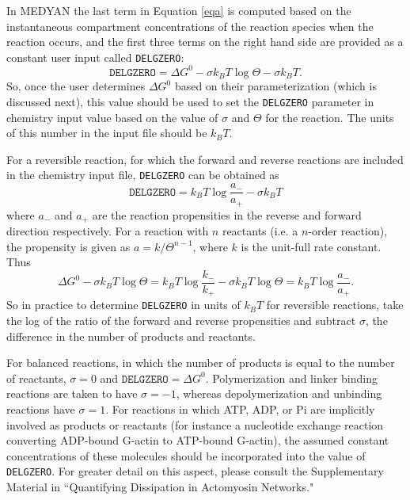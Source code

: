 \documentclass[11pt, oneside]{article}   	%
\begin{document}
In MEDYAN the last term in Equation \ref{eqa} is computed based on the instantaneous compartment concentrations of the reaction species when the reaction occurs, and the first three terms on the right hand side are provided as a constant user input called \texttt{DELGZERO}:
\begin{equation}
\label{eqc}
\texttt{DELGZERO} = \Delta G^0 - \sigma k_B T  \log{\Theta} - \sigma k_B T.
\end{equation}
So, once the user determines $\Delta G^0$ based on their parameterization (which is discussed next), this value should be used to set the \texttt{DELGZERO} parameter in chemistry input value based on the value of $\sigma$ and $\Theta$ for the reaction.  The units of this number in the input file should be $k_B T$.  

For a reversible reaction, for which the forward and reverse reactions are included in the chemistry input file, \texttt{DELGZERO} can be obtained as 
\begin{equation}
\texttt{DELGZERO} = k_B T \log{\frac{a_-}{a_+}} - \sigma k_B T
\end{equation}
where $a_-$ and $a_+$ are the reaction propensities in the reverse and forward direction respectively.  For a reaction with $n$ reactants (i.e. a $n$-order reaction), the propensity is given as $a = k/\Theta^{n-1}$, where $k$ is the unit-full rate constant.  Thus
\begin{equation}
\Delta G^0 - \sigma k_B T \log{\Theta} = k_B T \log{\frac{k_-}{k_+}}  - \sigma k_B T \log{\Theta} = k_B T \log{\frac{a_-}{a_+}}.
\end{equation}
So in practice to determine \texttt{DELGZERO} in units of $k_B T$ for reversible reactions, take the log of the ratio of the forward and reverse propensities and subtract $\sigma$, the difference in the number of products and reactants.  

  

For balanced reactions, in which the number of products is equal to the number of reactants, $\sigma = 0$ and $\texttt{DELGZERO} = \Delta G^0$.  Polymerization and linker binding reactions are taken to have $\sigma = -1$, whereas depolymerization and unbinding reactions have $\sigma = 1$.  For reactions in which ATP, ADP, or Pi are implicitly involved as products or reactants (for instance a nucleotide exchange reaction converting ADP-bound G-actin to ATP-bound G-actin), the assumed constant concentrations of these molecules should be incorporated into the value of \texttt{DELGZERO}.  For greater detail on this aspect, please consult the Supplementary Material in ``Quantifying Dissipation in Actomyosin Networks."  
\end{document}
